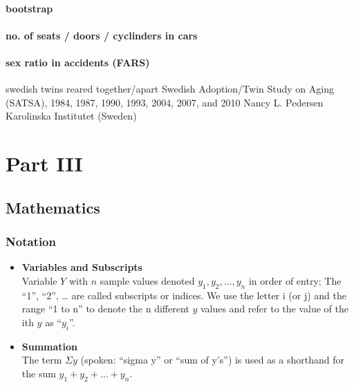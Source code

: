 \documentclass[]{book}
\begin{document}
\hypertarget{bootstrap}{%
\subsection{bootstrap}\label{bootstrap}}

\hypertarget{no.-of-seats-doors-cyclinders-in-cars}{%
\subsection{no. of seats / doors / cyclinders in cars}\label{no.-of-seats-doors-cyclinders-in-cars}}

\hypertarget{sex-ratio-in-accidents-fars}{%
\subsection{sex ratio in accidents (FARS)}\label{sex-ratio-in-accidents-fars}}

swedish twins reared together/apart
Swedish Adoption/Twin Study on Aging (SATSA), 1984, 1987, 1990, 1993, 2004, 2007, and 2010
Nancy L. Pedersen
Karolinska Institutet (Sweden)

\hypertarget{part-part-iii}{%
\part{Part III}\label{part-part-iii}}

\hypertarget{math}{%
\chapter{Mathematics}\label{math}}

\hypertarget{notation}{%
\section{Notation}\label{notation}}

\begin{itemize}
\item
  \textbf{Variables and Subscripts}\\
  Variable \(Y\) with \(n\) sample values denoted \(y_1, y_2, ..., y_n\) in order of entry; The ``1'', ``2'', \ldots{} are called subscripts or indices. We use the letter i (or j) and the range ``1 to n'' to denote the n different \(y\) values and refer to the value of the ith \(y\) as ``\(y_i\)''.
\item
  \textbf{Summation}\\
  The term \(\Sigma y\) (spoken: ``sigma y'' or ``sum of y's'') is used as a shorthand for the sum \(y_1 + y_2 + \dots + y_n\).
\end{itemize}
\end{document}
